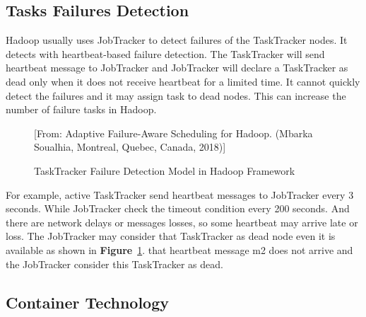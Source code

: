 \documentclass[12pt,oneside,openright,a4paper]{cpe-english-project}
\begin{document}
\subsection{Tasks Failures Detection}
Hadoop usually uses JobTracker to detect failures of the TaskTracker nodes.  It detects with heartbeat-based failure detection.  The TaskTracker will send heartbeat message to JobTracker and JobTracker will declare a TaskTracker as dead only when it does not receive heartbeat for a limited time.  It cannot quickly detect the failures and it may assign task to dead nodes.  This can increase the number of failure tasks in Hadoop. \cite{adaptiveScheduling}

\begin{figure}[!h]\centering
  \setlength{\fboxrule}{0mm} %
  \setlength{\fboxsep}{0cm}
  \caption{TaskTracker Failure Detection Model in Hadoop Framework}\label{fig:tasktracker}
  [From: Adaptive Failure-Aware Scheduling for Hadoop. (Mbarka Soualhia, Montreal, Quebec, Canada, 2018)]
\end{figure}

For example, active TaskTracker send heartbeat messages to JobTracker every 3 seconds.  While JobTracker check the timeout condition every 200 seconds.  And there are network delays or messages losses, so some heartbeat may arrive late or loss.  The JobTracker may consider that TaskTracker as dead node even it is available as shown in \textbf{Figure}~\ref{fig:tasktracker}. that heartbeat message m2 does not arrive and the JobTracker consider this TaskTracker as dead.

\newpage

\subsection{Container Technology}
\end{document}
